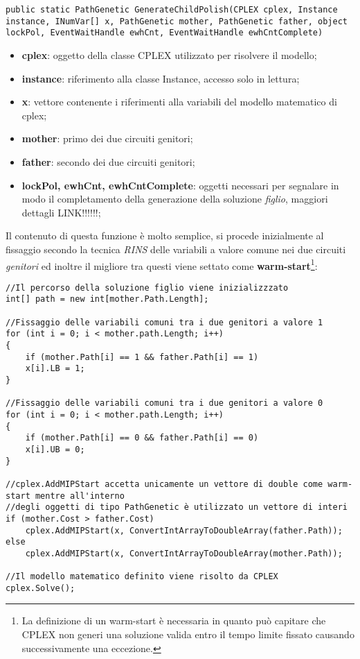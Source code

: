 \documentclass[11pt]{article}
\begin{document}
\begin{lstlisting}
public static PathGenetic GenerateChildPolish(CPLEX cplex, Instance instance, INumVar[] x, PathGenetic mother, PathGenetic father, object lockPol, EventWaitHandle ewhCnt, EventWaitHandle ewhCntComplete)
\end{lstlisting}

\begin{itemize}
    \item \textbf{cplex}: oggetto della classe CPLEX utilizzato per risolvere il modello;
    \item \textbf{instance}: riferimento alla classe Instance, accesso solo in lettura;
    \item \textbf{x}: vettore contenente i riferimenti alla variabili del modello matematico di cplex;
    \item \textbf{mother}: primo dei due circuiti genitori;
    \item \textbf{father}: secondo dei due circuiti genitori;
    \item \textbf{lockPol, ewhCnt, ewhCntComplete}: oggetti necessari per segnalare in modo il completamento della generazione della soluzione \textit{figlio}, maggiori dettagli LINK!!!!!!;
\end{itemize}

Il contenuto di questa funzione è molto semplice, si procede inizialmente al fissaggio secondo la tecnica \textit{RINS} delle variabili a valore comune nei due circuiti \textit{genitori} ed inoltre il migliore tra questi viene settato come \textbf{warm-start}\footnote{La definizione di un warm-start è necessaria in quanto può capitare che CPLEX non generi una soluzione valida entro il tempo limite fissato causando successivamente una eccezione.}:

\begin{lstlisting}
//Il percorso della soluzione figlio viene inizializzzato
int[] path = new int[mother.Path.Length];

//Fissaggio delle variabili comuni tra i due genitori a valore 1
for (int i = 0; i < mother.path.Length; i++)
{
    if (mother.Path[i] == 1 && father.Path[i] == 1)
    x[i].LB = 1;
}

//Fissaggio delle variabili comuni tra i due genitori a valore 0
for (int i = 0; i < mother.path.Length; i++)
{
    if (mother.Path[i] == 0 && father.Path[i] == 0)
    x[i].UB = 0;
}

//cplex.AddMIPStart accetta unicamente un vettore di double come warm-start mentre all'interno
//degli oggetti di tipo PathGenetic è utilizzato un vettore di interi
if (mother.Cost > father.Cost)
    cplex.AddMIPStart(x, ConvertIntArrayToDoubleArray(father.Path));
else
    cplex.AddMIPStart(x, ConvertIntArrayToDoubleArray(mother.Path));
    
//Il modello matematico definito viene risolto da CPLEX
cplex.Solve();
\end{lstlisting}
\end{document}
